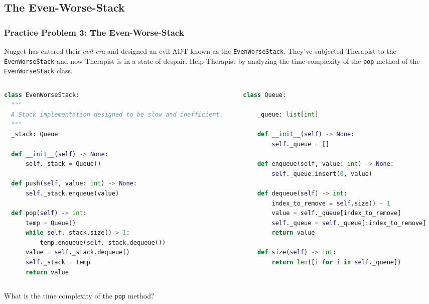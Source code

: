 \documentclass[hyperref={colorlinks,citecolor=blue,linkcolor=blue,urlcolor=blue}, aspectratio=1610]{beamer}
\begin{document}
\subsection{The Even-Worse-Stack}
\begin{frame}[fragile]
  \frametitle{Practice Problem 3: The Even-Worse-Stack}
  Nugget has entered their \textit{evil era} and designed an evil ADT known as the \texttt{EvenWorseStack}. They've subjected Therapist to the \texttt{EvenWorseStack} and now Therapist is in a state of despair. Help Therapist by analyzing the time complexity of the \texttt{pop} method of the \texttt{EvenWorseStack} class.\\

  \begin{columns}[T,onlytextwidth]
  
    \begin{column}{0.48\textwidth}
      \begin{lstlisting}[language=Python, style=mystyle, basicstyle=\tiny]
class EvenWorseStack:
  """
  A Stack implementation designed to be slow and inefficient.
  """
  _stack: Queue
  
  def __init__(self) -> None:
      self._stack = Queue()
  
  def push(self, value: int) -> None:
      self._stack.enqueue(value)
  
  def pop(self) -> int:
      temp = Queue()
      while self._stack.size() > 1:
          temp.enqueue(self._stack.dequeue())
      value = self._stack.dequeue()
      self._stack = temp
      return value
      \end{lstlisting}
    \end{column}
    
    \begin{column}{0.48\textwidth}
      \begin{lstlisting}[language=Python, style=mystyle, basicstyle=\tiny]
class Queue:
    
    _queue: list[int]
    
    def __init__(self) -> None:
        self._queue = []
    
    def enqueue(self, value: int) -> None:
        self._queue.insert(0, value)
    
    def dequeue(self) -> int:
        index_to_remove = self.size() - 1
        value = self._queue[index_to_remove]
        self._queue = self._queue[:index_to_remove]
        return value
    
    def size(self) -> int:
        return len([i for i in self._queue])
      \end{lstlisting}
    \end{column}
    
  \end{columns}
  What is the time complexity of the \texttt{pop} method?
\end{frame}
\end{document}
